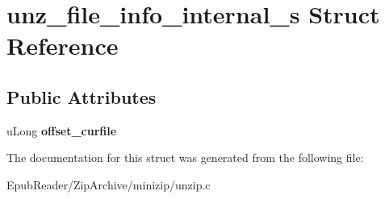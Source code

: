 \hypertarget{structunz__file__info__internal__s}{\section{unz\-\_\-file\-\_\-info\-\_\-internal\-\_\-s Struct Reference}
\label{structunz__file__info__internal__s}
}
\subsection*{Public Attributes}
\begin{DoxyCompactItemize}
\item 
\hypertarget{structunz__file__info__internal__s_a23d3a1c3584888bdf066d7bfed95f62e}{u\-Long {\bfseries offset\-\_\-curfile}}\label{structunz__file__info__internal__s_a23d3a1c3584888bdf066d7bfed95f62e}

\end{DoxyCompactItemize}


The documentation for this struct was generated from the following file\-:\begin{DoxyCompactItemize}
\item 
Epub\-Reader/\-Zip\-Archive/minizip/unzip.\-c\end{DoxyCompactItemize}
